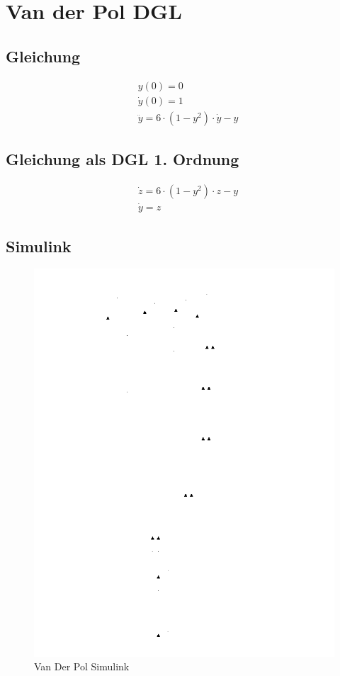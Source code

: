 \documentclass[10pt]{scrartcl}
\begin{document}
\section{Van der Pol DGL}
	\subsection{Gleichung}
		\begin{align}
		&y(0) = 0\\
		&\dot{y}(0) = 1\\
		&\ddot{y} = 6 \cdot (1-y^2) \cdot \dot{y} -y
		\end{align}
	\subsection{Gleichung als DGL 1. Ordnung}
		\begin{align}
			&\dot{z} = 6 \cdot (1-y^2) \cdot z - y\\
			&\dot{y} = z
		\end{align}
		
		\subsection{Simulink}
		\begin{figure}[H]
			\centering	
			\includegraphics[width=\textwidth, angle=-90]{Prak1Aufg2Simulink.png}
            \caption{Van Der Pol Simulink}
            \label{pic:lorenzSimulink}
		\end{figure} 	
		
\end{document}

